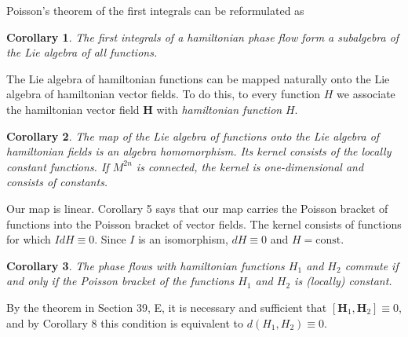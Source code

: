 \documentclass[leqno]{book}
\numberwithin{equation}{section}
\theoremstyle{plain}
\newtheorem{cor}{Corollary}
\let\oldendproof\endproof
\renewenvironment{proof}[1][\proofname]{%
  \oldproof[\textsc{#1}]%
}{\oldendproof}
\theoremstyle{definition}
\theoremstyle{remark}
\theoremstyle{smallcap}
\numberwithin{prob}{section}
\begin{document}
Poisson's theorem of the first integrals
can be reformulated as

\begin{cor}
  The first integrals of a hamiltonian phase flow
  form a subalgebra of the Lie algebra of all functions.
\end{cor}

The Lie algebra of hamiltonian functions can be
mapped naturally onto the Lie algebra of hamiltonian
vector fields.
%
To do this, to every function $H$ we associate the hamiltonian
vector field $\mathbf H$ with \emph{hamiltonian function} $H$.

\begin{cor}
  The map of the Lie algebra of functions
  onto the Lie algebra of hamiltonian fields
  is an algebra homomorphism.
  Its kernel consists of the locally constant
  functions.
  If $M^{2n}$ is connected,
  the kernel is one-dimensional and consists of constants.
\end{cor}


\begin{proof}
  Our map is linear. Corollary 5 says that our map carries
  the Poisson bracket of functions into the Poisson bracket
  of vector fields. The kernel consists of functions
  for which $IdH \equiv 0$.
  Since $I$ is an isomorphism, $dH \equiv 0$ and $H = \mathrm{const}$.
\end{proof}

\begin{cor}
  The phase flows with hamiltonian functions $H_1$ and $H_2$
  commute if and only if the Poisson bracket of the functions
  $H_1$ and $H_2$ is (locally) constant.
\end{cor}

\begin{proof}
  By the theorem in Section 39, E, it is necessary and sufficient
  that $[\mathbf H_1, \mathbf H_2] \equiv 0$,
  and by Corollary 8 this condition is equivalent to
  $d(H_1, H_2) \equiv 0$.
\end{proof}
\end{document}
